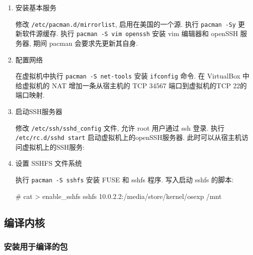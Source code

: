 \documentclass[11pt]{report}
\begin{document}
            \begin{enumerate}
                \item 安装基本服务

                    修改 \verb|/etc/pacman.d/mirrorlist|, 启用在美国的一个源. 执行 \verb|pacman -Sy| 更新软件源缓存. 执行 \verb|pacman -S vim openssh| 安装 vim 编辑器和 openSSH 服务器, 期间 pacman 会要求先更新其自身.

                \item 配置网络

                    在虚拟机中执行 \verb|pacman -S net-tools| 安装 \verb|ifconfig| 命令. 在 VirtualBox 中给虚拟机的 NAT 增加一条从宿主机的 TCP 34567 端口到虚拟机的TCP 22的端口映射.

                \item 启动SSH服务器

                    修改 \verb|/etc/ssh/sshd_config| 文件, 允许 root 用户通过 ssh 登录. 执行 \verb|/etc/rc.d/sshd start| 启动虚拟机上的openSSH服务器. 此时可以从宿主机访问虚拟机上的SSH服务:

                \item 设置 SSHFS 文件系统

                    执行 \verb|pacman -S sshfs| 安装 FUSE 和 sshfs 程序. 写入启动 sshfs 的脚本:

                    \begin{console}
# cat > enable_sshfs
sshfs 10.0.2.2:/media/store/kernel/osexp /mnt
\end{console}
            \end{enumerate}

        \subsection{编译内核}

            \subsubsection{安装用于编译的包}
\end{document}
